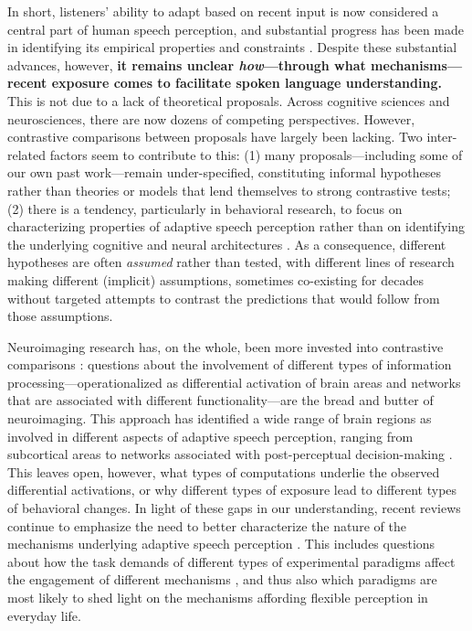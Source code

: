 \documentclass[
  11pt,
  man,floatsintext]{apa6}
\begin{document}
In short, listeners' ability to adapt based on recent input is now considered a central part of human speech perception, and substantial progress has been made in identifying its empirical properties and constraints \autocites[for comprehensive reviews, see][]{baeseberk2020,johnson-sjerps2021,tzeng2021,quam-creel2021,stilp2020}. Despite these substantial advances, however, \textbf{it remains unclear \emph{how}---through what mechanisms---recent exposure comes to facilitate spoken language understanding.} This is not due to a lack of theoretical proposals. Across cognitive sciences and neurosciences, there are now dozens of competing perspectives. However, contrastive comparisons between proposals have largely been lacking. Two inter-related factors seem to contribute to this: (1) many proposals---including some of our own past work---remain under-specified, constituting informal hypotheses rather than theories or models that lend themselves to strong contrastive tests; (2) there is a tendency, particularly in behavioral research, to focus on characterizing properties of adaptive speech perception rather than on identifying the underlying cognitive and neural architectures \autocites[but see][]{apfelbaum-mcmurray2015,chodroff-wilson2020,hoffmanbion-escudero2007,kleinschmidt-jaeger2015,kiefte-nearey2019,lehet-holt2020,mcmurray-jongman2011,xie2021cognition}. As a consequence, different hypotheses are often \emph{assumed} rather than tested, with different lines of research making different (implicit) assumptions, sometimes co-existing for decades without targeted attempts to contrast the predictions that would follow from those assumptions.

Neuroimaging research has, on the whole, been more invested into contrastive comparisons \autocites[e.g.,][]{bonte2017,erb2013brain,guediche2015evidence,myers-mesite2014}: questions about the involvement of different types of information processing---operationalized as differential activation of brain areas and networks that are associated with different functionality---are the bread and butter of neuroimaging. This approach has identified a wide range of brain regions as involved in different aspects of adaptive speech perception, ranging from subcortical areas \autocites[e.g.,][]{skoe2021auditory,guediche2015evidence} to networks associated with post-perceptual decision-making \autocites[e.g.,][]{myers-mesite2014,erb2013brain}. This leaves open, however, what types of computations underlie the observed differential activations, or why different types of exposure lead to different types of behavioral changes. In light of these gaps in our understanding, recent reviews continue to emphasize the need to better characterize the nature of the mechanisms underlying adaptive speech perception \autocites[from, e.g.,][]{samuel-kraljic2009}[to][]{weatherholtz-jaeger2016}[to][]{baeseberk2020}. This includes questions about how the task demands of different types of experimental paradigms affect the engagement of different mechanisms \autocite{baeseberk2018,zheng-samuel2020}, and thus also which paradigms are most likely to shed light on the mechanisms affording flexible perception in everyday life.
\end{document}
